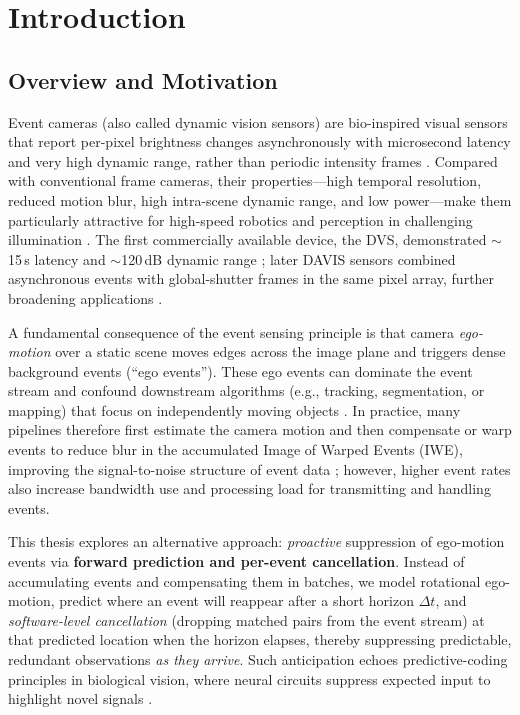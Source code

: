 \chapter{Introduction}

\section{Overview and Motivation}

Event cameras (also called dynamic vision sensors) are bio-inspired visual sensors that report per-pixel brightness changes asynchronously with microsecond latency and very high dynamic range, rather than periodic intensity frames \cite{Gallego2020Survey}. Compared with conventional frame cameras, their properties—high temporal resolution, reduced motion blur, high intra-scene dynamic range, and low power—make them particularly attractive for high-speed robotics and perception in challenging illumination \cite{Gallego2020Survey,Lichtsteiner2008DVS,Brandli2014DAVIS}. The first commercially available device, the DVS, demonstrated $\sim$15\,\textmu s latency and $\sim$120\,dB dynamic range \cite{Lichtsteiner2008DVS}; later DAVIS sensors combined asynchronous events with global-shutter frames in the same pixel array, further broadening applications \cite{Brandli2014DAVIS}. 

A fundamental consequence of the event sensing principle is that camera \emph{ego-motion} over a static scene moves edges across the image plane and triggers dense background events (``ego events''). These ego events can dominate the event stream and confound downstream algorithms (e.g., tracking, segmentation, or mapping) that focus on independently moving objects \cite{Stoffregen2019Segmentation,Gallego2020Survey}. In practice, many pipelines therefore first estimate the camera motion and then compensate or warp events to reduce blur in the accumulated Image of Warped Events (IWE), improving the signal-to-noise structure of event data \cite{Gallego2018CMax,Bardow2016SOFIE}; however, higher event rates also increase bandwidth use and processing load for transmitting and handling events. 

This thesis explores an alternative approach: \emph{proactive} suppression of ego-motion events via \textbf{forward prediction and per-event cancellation}. Instead of accumulating events and compensating them in batches, we model rotational ego-motion, predict where an event will reappear after a short horizon $\Delta t$, and \emph{software-level cancellation} (dropping matched pairs from the event stream) at that predicted location when the horizon elapses, thereby suppressing predictable, redundant observations \emph{as they arrive}. Such anticipation echoes predictive-coding principles in biological vision, where neural circuits suppress expected input to highlight novel signals \cite{Hosoya2005RetinaPC,Rao1999V1PC}. 


